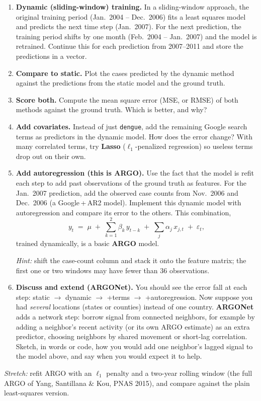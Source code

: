 \documentclass[11pt]{article}
\begin{document}
\begin{enumerate}[label=(\alph*)]
  \item \textbf{Dynamic (sliding-window) training.} In a sliding-window approach, the
        original training period (Jan.\ 2004 -- Dec.\ 2006) fits a least squares model and
        predicts the next time step (Jan.\ 2007). For the next prediction, the training
        period shifts by one month (Feb.\ 2004 -- Jan.\ 2007) and the model is retrained.
        Continue this for each prediction from 2007--2011 and store the predictions in a
        vector.

  \item \textbf{Compare to static.} Plot the cases predicted by the dynamic method against
        the predictions from the static model and the ground truth.

  \item \textbf{Score both.} Compute the mean square error (MSE, or RMSE) of both methods
        against the ground truth. Which is better, and why?

  \item \textbf{Add covariates.} Instead of just \texttt{dengue}, add the remaining Google
        search terms as predictors in the dynamic model. How does the error change? With
        many correlated terms, try \textbf{Lasso} ($\ell_1$-penalized regression) so useless
        terms drop out on their own.

  \item \textbf{Add autoregression (this is ARGO).} Use the fact that the model is refit each
        step to add past observations of the ground truth as features. For the Jan.\ 2007
        prediction, add the observed case counts from Nov.\ 2006 and Dec.\ 2006 (a
        Google\,+\,AR2 model). Implement this dynamic model with autoregression and compare
        its error to the others. This combination,
        \[
          y_t \;=\; \mu \;+\; \sum_{k=1}^{2}\beta_k\,y_{t-k}
            \;+\; \sum_{j}\alpha_j\,x_{j,t} \;+\; \varepsilon_t,
        \]
        trained dynamically, is a basic \textbf{ARGO} model.

        \emph{Hint:} shift the case-count column and stack it onto the feature matrix; the
        first one or two windows may have fewer than 36 observations.

  \item \textbf{Discuss and extend (ARGONet).} You should see the error fall at each step:
        static $\to$ dynamic $\to$ +terms $\to$ +autoregression. Now suppose you had
        \emph{several} locations (states or counties) instead of one country. \textbf{ARGONet}
        adds a network step: borrow signal from connected neighbors, for example by adding a
        neighbor's recent activity (or its own ARGO estimate) as an extra predictor, choosing
        neighbors by shared movement or short-lag correlation. Sketch, in words or code, how
        you would add one neighbor's lagged signal to the model above, and say when you would
        expect it to help.
\end{enumerate}

\vfill
\noindent\textit{Stretch:} refit ARGO with an $\ell_1$ penalty and a two-year rolling window
(the full ARGO of Yang, Santillana \& Kou, PNAS 2015), and compare against the plain
least-squares version.
\end{document}
